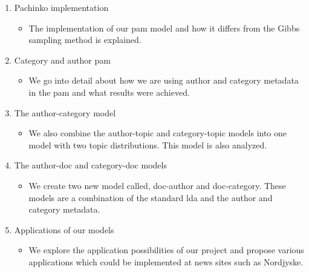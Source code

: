 \begin{enumerate}
\begin{itemize}
	\end{itemize}
	\item Pachinko implementation
	\begin{itemize}
		\item The implementation of our \gls{pam} model and how it differs from the Gibbs sampling method is explained.
	\end{itemize}
	\item Category and author \gls{pam}
	\begin{itemize}
		\item We go into detail about how we are using author and category metadata in the \gls{pam} and what results were achieved.
	\end{itemize}
	\item The author-category model
	\begin{itemize}
		\item We also combine the author-topic and category-topic models into one model with two topic distributions. This model is also analyzed.
	\end{itemize}
	\item The author-doc and category-doc models
	\begin{itemize}
		\item We create two new model called, doc-author and doc-category. These models are a combination of the standard \gls{lda} and the author and category metadata.
	\end{itemize}
	\item Applications of our models
	\begin{itemize}
		\item We explore the application possibilities of our project and propose various applications which could be implemented at news sites such as Nordjyske.
	\end{itemize}
\end{enumerate}
